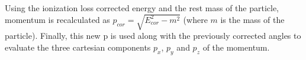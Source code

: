 
    

Using the ionization loss corrected energy and the rest mass of the particle, momentum is recalculated as $p_{cor} = \sqrt{E^2_{cor}-m^2}$ (where $m$ is the mass of the particle). Finally, this new p is used along with the previously corrected angles to evaluate the three cartesian components $p_x$, $p_y$ and $p_z$ of the momentum.



